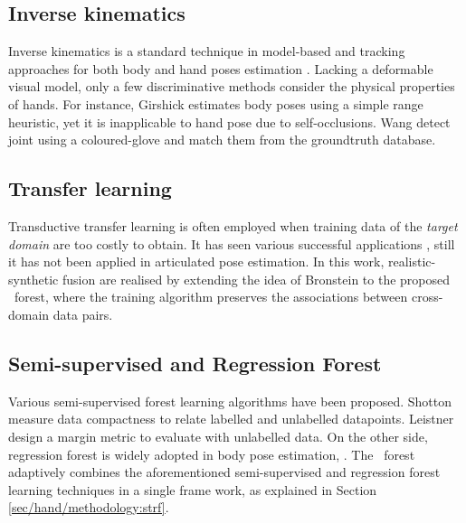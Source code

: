 \subsection{Inverse kinematics}   
Inverse kinematics is a standard technique in model-based and tracking approaches for both body \cite{Yao2012, Pons-Moll2011} and hand poses estimation \cite{LaGorce2011, Oikonomidis2012, Stenger2006}. Lacking a deformable visual model, only a few discriminative methods consider the physical properties of hands. For instance, Girshick \etal \cite{Girshick2011} estimates body poses using a simple range heuristic, yet it is inapplicable to hand pose due to self-occlusions.  
Wang \etal \cite{Wang2009} detect joint using a coloured-glove and match them from the groundtruth database. 

\subsection{Transfer learning} 
Transductive transfer learning is often employed when training data of the \emph{target domain} are too costly to obtain. It has seen various successful applications \cite{Pan2010}, still it has not been applied in articulated pose estimation. In this work, realistic-synthetic fusion are realised by extending the idea of Bronstein \etal \cite{Bronstein2010} to the proposed \STR\ forest, where the training algorithm preserves the associations between cross-domain data pairs.

\subsection{Semi-supervised and Regression Forest} Various semi-supervised forest learning algorithms have been proposed. Shotton \etal \cite{Shotton2013} measure data compactness to relate labelled and unlabelled datapoints. Leistner \etal \cite{Leistner2009} design a margin metric to evaluate with unlabelled data. On the other side, regression forest is widely adopted in body pose estimation, \eg \cite{Girshick2011, Sun2012}. The \STR\ forest adaptively combines the aforementioned semi-supervised and regression forest learning techniques in a single frame work, as explained in Section \ref{sec/hand/methodology:strf}.


